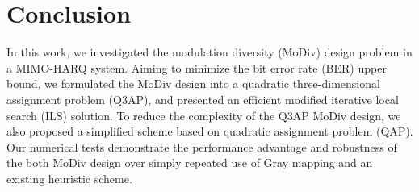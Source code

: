 \documentclass[journal,draftcls,onecolumn,12pt,twoside]{IEEEtran}
\begin{document}
\section{Conclusion}
\label{sec:conclusion}
In this work, we investigated the modulation diversity (MoDiv) design problem in
a MIMO-HARQ system. Aiming to minimize the bit error rate (BER)
upper bound, we formulated the MoDiv design into a quadratic three-dimensional
assignment problem (Q3AP), and presented an efficient modified iterative local
search (ILS) solution. To reduce the complexity of the Q3AP MoDiv design, we
also proposed a simplified scheme based on quadratic assignment problem
(QAP). Our numerical tests demonstrate the performance advantage and robustness
of the both MoDiv design over simply repeated use of Gray mapping and an
existing heuristic scheme.
%
%

\end{document}
